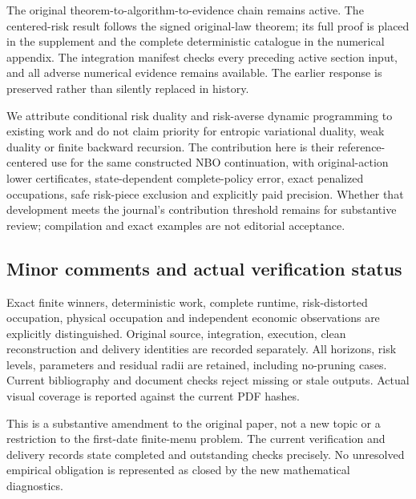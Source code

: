 The original theorem-to-algorithm-to-evidence chain remains active. The
centered-risk result follows the signed original-law theorem; its full
proof is placed in the supplement and the complete deterministic
catalogue in the numerical appendix. The integration manifest checks
every preceding active section input, and all adverse numerical evidence
remains available. The earlier response is preserved rather than
silently replaced in history.

We attribute conditional risk duality and risk-averse dynamic
programming to existing work and do not claim priority for entropic
variational duality, weak duality or finite backward recursion. The
contribution here is their reference-centered use for the same
constructed NBO continuation, with original-action lower certificates,
state-dependent complete-policy error, exact penalized occupations, safe
risk-piece exclusion and explicitly paid precision. Whether that
development meets the journal's contribution threshold remains for
substantive review; compilation and exact examples are not editorial
acceptance.

\hypertarget{minor-comments-and-actual-verification-status}{%
\subsection{Minor comments and actual verification
status}\label{minor-comments-and-actual-verification-status}}

Exact finite winners, deterministic work, complete runtime,
risk-distorted occupation, physical occupation and independent economic
observations are explicitly distinguished. Original source, integration,
execution, clean reconstruction and delivery identities are recorded
separately. All horizons, risk levels, parameters and residual radii are
retained, including no-pruning cases. Current bibliography and document
checks reject missing or stale outputs. Actual visual coverage is
reported against the current PDF hashes.

This is a substantive amendment to the original paper, not a new topic
or a restriction to the first-date finite-menu problem. The current
verification and delivery records state completed and outstanding checks
precisely. No unresolved empirical obligation is represented as closed
by the new mathematical diagnostics.
